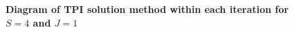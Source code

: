\documentclass[letterpaper,12pt]{article}
\theoremstyle{definition}
\begin{document}
  \begin{figure}[p]\centering \captionsetup{width=4.0in}
    \caption{\label{FigTPIdiag}\textbf{Diagram of TPI solution method within each iteration for $S=4$ and $J=1$}}
  \end{figure}
\end{document}
